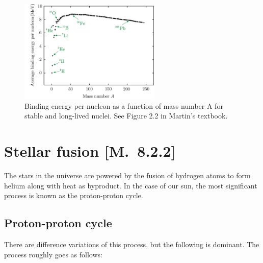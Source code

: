 \documentclass[a4paper,12pt]{article}
\theoremstyle{remark}
\renewcommand{\=}[1]{\stackrel{#1}{=}} %
\theoremstyle{plain}
\theoremstyle{definition}
\begin{document}
\begin{figure}[t]
\begin{center}
    \includegraphics*[angle=0,width=0.6\textwidth]{img/fig1.png}
    \caption[Binding energy per nucleon]{Binding energy per nucleon as a function of mass number A for stable and long-lived nuclei. See Figure 2.2 in Martin's textbook.}
\label{fig:binding_energy}
\end{center}
\end{figure}

\section{Stellar fusion [M.\ 8.2.2]}
The stars in the universe are powered by the fusion of hydrogen atoms to form helium along with heat as byproduct. In the case of our sun, the most significant process is known as the proton-proton cycle.
\subsection{Proton-proton cycle}
There are difference variations of this process, but the following is dominant. The process roughly goes as follows:
 
\end{document}
